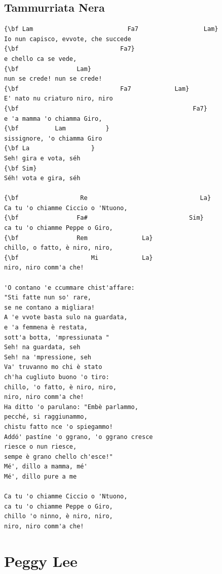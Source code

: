 \documentclass[a4paper]{article}
\begin{document}
\subsection{Tammurriata Nera}
\begin{Verbatim}[commandchars=\\\{\}]
{\bf Lam                          Fa7                  Lam}
Io nun capisco, evvote, che succede 
{\bf                            Fa7}
e chello ca se vede,
{\bf                Lam}
nun se crede! nun se crede!
{\bf                            Fa7            Lam}
E' nato nu criaturo niro, niro 
{\bf                                                Fa7}
e 'a mamma 'o chiamma Giro,
{\bf          Lam           }
sissignore, 'o chiamma Giro 
{\bf La                 }
Seh! gira e vota, séh 
{\bf Sim}
Séh! vota e gira, séh 

{\bf                 Re                               La}
Ca tu 'o chiamme Ciccio o 'Ntuono,
{\bf                Fa#                            Sim}
ca tu 'o chiamme Peppe o Giro,
{\bf                Rem               La}
chillo, o fatto, è niro, niro,
{\bf                    Mi            La}
niro, niro comm'a che! 

'O contano 'e ccummare chist'affare:
"Sti fatte nun so' rare,
se ne contano a migliara!
A 'e vvote basta sulo na guardata,
e 'a femmena è restata,
sott'a botta, 'mpressiunata "
Seh! na guardata, seh 
Seh! na 'mpressione, seh 
Va' truvanno mo chi è stato
ch'ha cugliuto buono 'o tiro:
chillo, 'o fatto, è niro, niro,
niro, niro comm'a che! 
Ha ditto 'o parulano: "Embè parlammo,
pecché, si raggiunammo,
chistu fatto nce 'o spiegammo!
Addó' pastíne 'o ggrano, 'o ggrano cresce 
riesce o nun riesce,
sempe è grano chello ch'esce!"
Mé', dillo a mamma, mé' 
Mé', dillo pure a me 

Ca tu 'o chiamme Ciccio o 'Ntuono,
ca tu 'o chiamme Peppe o Giro,
chillo 'o ninno, è niro, niro,
niro, niro comm'a che! 

\end{Verbatim}
\newpage
\section{Peggy Lee}
\end{document}
